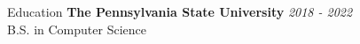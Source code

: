 \documentclass{resume} %
\begin{document}

\begin{rSection}{Education}
    {\bf The Pennsylvania State University} \hfill {\em 2018 - 2022}
    \\ B.S. in Computer Science
\end{rSection}
\end{document}
